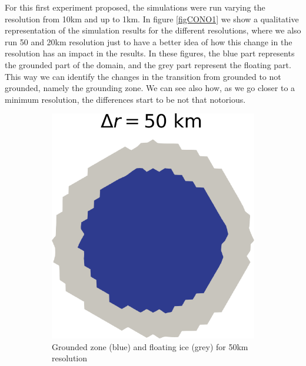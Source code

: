 \documentclass{article}
\begin{document}
For this first experiment proposed, the simulations were run varying the resolution from 10km and up to 1km. In figure \ref{figCONO1} we show a qualitative representation of the simulation results for the different resolutions, where we also run 50 and 20km resolution just to have a better idea of how this change in the resolution has an impact in the results. In these figures, the blue part represents the grounded part of the domain, and the grey part represent the floating part. This way we can identify the changes in the transition from grounded to not grounded, namely the grounding zone. We can see also how, as we go closer to a minimum resolution, the differences start to be not that notorious. 

\begin{figure}[!h]
	\centering %
	\begin{subfigure}{0.25\textwidth}
		\includegraphics[width=\linewidth]{../fig/Grounded_zone_50km_CONE.png}
		\caption{Grounded zone (blue) and floating ice (grey) for 50km resolution}
		\label{figCONE50KM}
	\end{subfigure}\hfil %
	\begin{subfigure}{0.25\textwidth}

\end{subfigure}
\end{figure}
\end{document}
